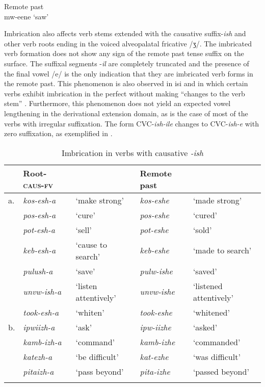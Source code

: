 \documentclass[output=paper]{langsci/langscibook}
\begin{document}
   \ex\label{ex:8b.kawasha} Remote past \\
     mw-eene ‘saw’ \\
\z
\z 

Imbrication also affects verb stems extended with the causative suffix-\textit{ish} and other verb roots ending in the voiced alveopalatal fricative /ʒ/. The imbricated verb formation does not show any sign of the remote past tense suffix on the surface. The suffixal segments -\textit{il} are completely truncated and the presence of the final vowel /e/ is the only indication that they are imbricated verb forms in the remote past. This phenomenon is also observed in isi and  in which certain verbs exhibit imbrication in the perfect without making “changes to the verb stem” \citep{monich2015}. Furthermore, this phenomenon does not yield an expected vowel lengthening in the derivational extension domain, as is the case of most of the verbs with irregular suffixation. The form CVC-\textit{ish-ile} changes to CVC-\textit{ish-e} with zero suffixation, as exemplified in .

\begin{table}
\begin{tabularx}{\textwidth}{llXll}
\lsptoprule
 & Root-\textsc{caus}-\textsc{fv} &  & Remote past & \\
\midrule
a. & \textit{kos-esh-a} & `make strong' & \textit{kos-eshe} & `made strong' \\
 & \textit{pos-esh-a} & `cure' & \textit{pos-eshe} & `cured' \\
 & \textit{pot-esh-a} & `sell' & \textit{pot-eshe} & `sold' \\
 & \textit{keb-esh-a} & `cause to search' & \textit{keb-eshe} & `made to search' \\
 & \textit{pulush-a} & `save' & \textit{pulw-ishe} & `saved' \\
 & \textit{unvw-ish-a} & `listen attentively' & \textit{unvw-ishe} & `listened attentively' \\
 & \textit{took-esh-a} & `whiten' & \textit{took-eshe} & `whitened' \\
\tablevspace
b. & \textit{ipwiizh-a} & `ask' & \textit{ipw-iizhe} & `asked' \\
 & \textit{kamb-izh-a} & `command' & \textit{kamb-izhe} & `commanded' \\
 & \textit{katezh-a} & `be difficult' & \textit{kat-ezhe} & `was difficult' \\
 & \textit{pitaizh-a} & `pass beyond' & \textit{pita-izhe} & `passed beyond' \\

\lspbottomrule
\end{tabularx}

\caption{Imbrication in verbs with causative \textit{-ish}}
\label{tab:24.kawasha}

\end{table}
\end{document}
